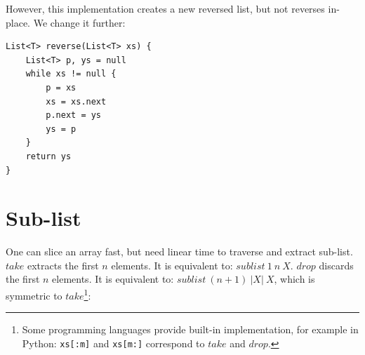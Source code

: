 \documentclass[b5paper]{article}
\begin{document}
However, this implementation creates a new reversed list, but not reverses in-place. We change it further:

\begin{lstlisting}[language=Bourbaki]
List<T> reverse(List<T> xs) {
    List<T> p, ys = null
    while xs != null {
        p = xs
        xs = xs.next
        p.next = ys
        ys = p
    }
    return ys
}
\end{lstlisting}

\begin{Exercise}\label{ex:list-transform}
\end{Exercise}

\begin{Answer}[ref = {ex:list-transform}]
\end{Answer}

\section{Sub-list}
   
One can slice an array fast, but need linear time to traverse and extract sub-list. $take$ extracts the first $n$ elements. It is equivalent to: $sublist\ 1\ n\ X$. $drop$ discards the first $n$ elements. It is equivalent to: $sublist\ (n+1)\ |X|\ X$, which is symmetric to $take$\footnote{Some programming languages provide built-in implementation, for example in Python: \texttt{xs[:m]} and \texttt{xs[m:]} correspond to $take$ and $drop$.}:

\be
{}
\ee
\end{document}
